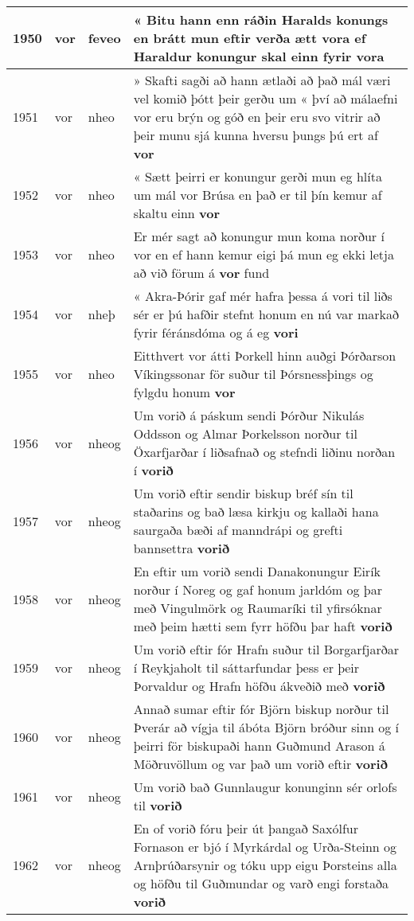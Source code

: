 \documentclass{article}
\begin{document}
\begin{longtable}{p{1cm}|p{1cm}|p{1cm}|p{13cm}}
\hline
1950&vor&feveo&« Bitu hann enn ráðin Haralds konungs en brátt mun eftir verða ætt vora ef Haraldur konungur skal einn fyrir \textbf{vora} \\
\hline
1951&vor&nheo&» Skafti sagði að hann ætlaði að það mál væri vel komið þótt þeir gerðu um « því að málaefni vor eru brýn og góð en þeir eru svo vitrir að þeir munu sjá kunna hversu þungs þú ert af \textbf{vor} \\
\hline
1952&vor&nheo&« Sætt þeirri er konungur gerði mun eg hlíta um mál vor Brúsa en það er til þín kemur af skaltu einn \textbf{vor} \\
\hline
1953&vor&nheo&Er mér sagt að konungur mun koma norður í vor en ef hann kemur eigi þá mun eg ekki letja að við förum á \textbf{vor} fund\\
\hline
1954&vor&nheþ&« Akra-Þórir gaf mér hafra þessa á vori til liðs sér er þú hafðir stefnt honum en nú var markað fyrir féránsdóma og á eg \textbf{vori} \\
\hline
1955&vor&nheo&Eitthvert vor átti Þorkell hinn auðgi Þórðarson Víkingssonar för suður til Þórsnessþings og fylgdu honum \textbf{vor} \\
\hline
1956&vor&nheog&Um vorið á páskum sendi Þórður Nikulás Oddsson og Almar Þorkelsson norður til Öxarfjarðar í liðsafnað og stefndi liðinu norðan í \textbf{vorið} \\
\hline
1957&vor&nheog&Um vorið eftir sendir biskup bréf sín til staðarins og bað læsa kirkju og kallaði hana saurgaða bæði af manndrápi og grefti bannsettra \textbf{vorið} \\
\hline
1958&vor&nheog&En eftir um vorið sendi Danakonungur Eirík norður í Noreg og gaf honum jarldóm og þar með Vingulmörk og Raumaríki til yfirsóknar með þeim hætti sem fyrr höfðu þar haft \textbf{vorið} \\
\hline
1959&vor&nheog&Um vorið eftir fór Hrafn suður til Borgarfjarðar í Reykjaholt til sáttarfundar þess er þeir Þorvaldur og Hrafn höfðu ákveðið með \textbf{vorið} \\
\hline
1960&vor&nheog&Annað sumar eftir fór Björn biskup norður til Þverár að vígja til ábóta Björn bróður sinn og í þeirri för biskupaði hann Guðmund Arason á Möðruvöllum og var það um vorið eftir \textbf{vorið} \\
\hline
1961&vor&nheog&Um vorið bað Gunnlaugur konunginn sér orlofs til \textbf{vorið} \\
\hline
1962&vor&nheog&En of vorið fóru þeir út þangað Saxólfur Fornason er bjó í Myrkárdal og Urða-Steinn og Arnþrúðarsynir og tóku upp eigu Þorsteins alla og höfðu til Guðmundar og varð engi forstaða \textbf{vorið} \\

\end{longtable}
\end{document}
